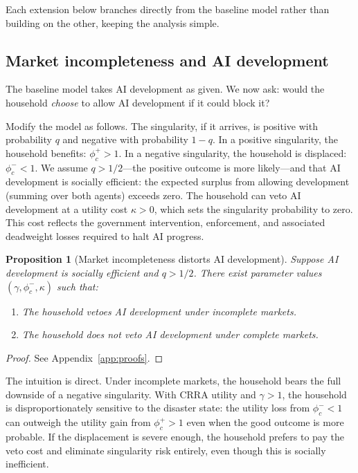 \documentclass[12pt]{article}
\newtheorem{proposition}{Proposition}
\begin{document}
Each extension below branches directly from the baseline model rather than building on the other, keeping the analysis simple.

\subsection{Market incompleteness and AI development}

The baseline model takes AI development as given.
We now ask: would the household \textit{choose} to allow AI development if it could block it?

Modify the model as follows.
The singularity, if it arrives, is positive with probability $q$ and negative with probability $1 - q$.
In a positive singularity, the household benefits: $\phi_c^+ > 1$.
In a negative singularity, the household is displaced: $\phi_c^- < 1$.
We assume $q > 1/2$---the positive outcome is more likely---and that AI development is socially efficient: the expected surplus from allowing development (summing over both agents) exceeds zero.
The household can veto AI development at a utility cost $\kappa > 0$, which sets the singularity probability to zero.
This cost reflects the government intervention, enforcement, and associated deadweight losses required to halt AI progress.

\begin{proposition}[Market incompleteness distorts AI development] \label{prop:veto} %
Suppose AI development is socially efficient and $q > 1/2$.
There exist parameter values $(\gamma, \phi_c^-, \kappa)$ such that:
\begin{enumerate}
\item[(a)] The household vetoes AI development under incomplete markets.
\item[(b)] The household does not veto AI development under complete markets.
\end{enumerate}
\end{proposition}

\begin{proof}
See Appendix~\ref{app:proofs}.
\end{proof}

The intuition is direct.
Under incomplete markets, the household bears the full downside of a negative singularity.
With CRRA utility and $\gamma > 1$, the household is disproportionately sensitive to the disaster state: the utility loss from $\phi_c^- < 1$ can outweigh the utility gain from $\phi_c^+ > 1$ even when the good outcome is more probable.
If the displacement is severe enough, the household prefers to pay the veto cost and eliminate singularity risk entirely, even though this is socially inefficient.
\end{document}
